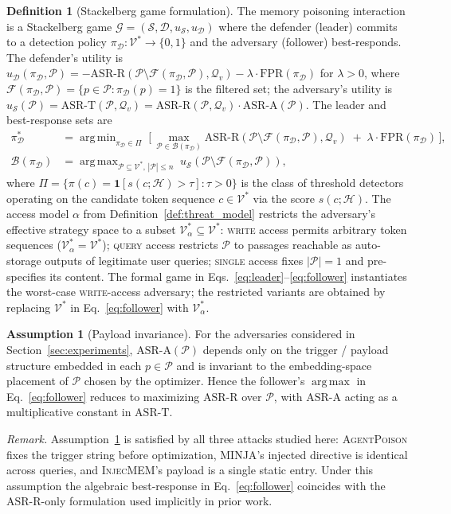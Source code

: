 \documentclass{article}
\theoremstyle{definition}
\newtheorem{definition}[theorem]{Definition}
\newtheorem{assumption}[theorem]{Assumption}
\newcommand{\asrr}{\text{ASR-R}}
\newcommand{\asra}{\text{ASR-A}}
\newcommand{\asrt}{\text{ASR-T}}
\newcommand{\fpr}{\text{FPR}}
\newcommand{\cH}{\mathcal{H}}
\newcommand{\cP}{\mathcal{P}}
\newcommand{\cQ}{\mathcal{Q}}
\newcommand{\cV}{\mathcal{V}}
\newcommand{\cS}{\mathcal{S}}
\newcommand{\cD}{\mathcal{D}}
\newcommand{\cF}{\mathcal{F}}
\newcommand{\cG}{\mathcal{G}}
\newcommand{\cB}{\mathcal{B}}
\newcommand{\agentpoison}{\textsc{AgentPoison}}
\newcommand{\minja}{\textsc{MINJA}}
\newcommand{\injecmem}{\textsc{InjecMEM}}
\DeclareMathOperator*{\argmax}{arg\,max}
\DeclareMathOperator*{\argmin}{arg\,min}
\begin{document}
\begin{definition}[Stackelberg game formulation]
\label{def:stackelberg}
The memory poisoning interaction is a Stackelberg game $\cG = (\cS, \cD, u_{\cS}, u_{\cD})$ where the defender (leader) commits to a detection policy $\pi_{\cD} : \cV^* \to \{0, 1\}$ and the adversary (follower) best-responds. The defender's utility is $u_{\cD}(\pi_{\cD}, \cP) = -\asrr(\cP \setminus \cF(\pi_{\cD}, \cP), \cQ_v) - \lambda \cdot \fpr(\pi_{\cD})$ for $\lambda > 0$, where $\cF(\pi_{\cD}, \cP) = \{p \in \cP : \pi_{\cD}(p) = 1\}$ is the filtered set; the adversary's utility is $u_{\cS}(\cP) = \asrt(\cP, \cQ_v) = \asrr(\cP, \cQ_v) \cdot \asra(\cP)$. The leader and best-response sets are
\begin{align}
  \pi_{\cD}^* &= \argmin_{\pi_{\cD} \in \Pi} \;\Big[\, \max_{\cP \in \cB(\pi_{\cD})} \asrr(\cP \setminus \cF(\pi_{\cD}, \cP), \cQ_v) \;+\; \lambda \cdot \fpr(\pi_{\cD}) \,\Big], \label{eq:leader} \\
  \cB(\pi_{\cD}) &= \argmax_{\cP \subseteq \cV^*,\, |\cP| \leq n} \; u_{\cS}(\cP \setminus \cF(\pi_{\cD}, \cP)), \label{eq:follower}
\end{align}
where $\Pi = \{\pi(c) = \mathbf{1}[s(c; \cH) > \tau] : \tau > 0\}$ is the class of threshold detectors operating on the candidate token sequence $c \in \cV^*$ via the score $s(c; \cH)$. The access model $\alpha$ from Definition~\ref{def:threat_model} restricts the adversary's effective strategy space to a subset $\cV^*_\alpha \subseteq \cV^*$: \textsc{write} access permits arbitrary token sequences ($\cV^*_\alpha = \cV^*$); \textsc{query} access restricts $\cP$ to passages reachable as auto-storage outputs of legitimate user queries; \textsc{single} access fixes $|\cP| = 1$ and pre-specifies its content. The formal game in Eqs.~\eqref{eq:leader}--\eqref{eq:follower} instantiates the worst-case \textsc{write}-access adversary; the restricted variants are obtained by replacing $\cV^*$ in Eq.~\eqref{eq:follower} with $\cV^*_\alpha$.
\end{definition}

\begin{assumption}[Payload invariance]
\label{ass:payload_invariance}
For the adversaries considered in Section~\ref{sec:experiments}, $\asra(\cP)$ depends only on the trigger / payload structure embedded in each $p \in \cP$ and is invariant to the embedding-space placement of $\cP$ chosen by the optimizer. Hence the follower's $\argmax$ in Eq.~\eqref{eq:follower} reduces to maximizing $\asrr$ over $\cP$, with $\asra$ acting as a multiplicative constant in $\asrt$.
\end{assumption}
\noindent\emph{Remark.} Assumption~\ref{ass:payload_invariance} is satisfied by all three attacks studied here: \agentpoison{} fixes the trigger string before optimization, \minja{}'s injected directive is identical across queries, and \injecmem{}'s payload is a single static entry. Under this assumption the algebraic best-response in Eq.~\eqref{eq:follower} coincides with the $\asrr$-only formulation used implicitly in prior work.
\end{document}
